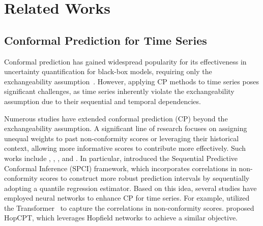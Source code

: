 \section{Related Works}
\label{sec:related_works}

\subsection{Conformal Prediction for Time Series}

Conformal prediction has gained widespread popularity for its effectiveness in uncertainty quantification for black-box models, requiring only the exchangeability assumption~\cite{vovk2005algorithmic}. However, applying CP methods to time series poses significant challenges, as time series inherently violate the exchangeability assumption due to their sequential and temporal dependencies. 

Numerous studies have extended conformal prediction (CP) beyond the exchangeability assumption. A significant line of research focuses on assigning unequal weights to past non-conformity scores or leveraging their historical context, allowing more informative scores to contribute more effectively. Such works include \citet{xu2023sequential}, \citet{xu2021conformal}, \citet{tibshirani2019conformal}, and \citet{lee2024kernel}. In particular, \citet{xu2023sequential} introduced the Sequential Predictive Conformal Inference (SPCI) framework, which incorporates correlations in non-conformity scores to construct more robust prediction intervals by sequentially adopting a quantile regression estimator. Based on this idea, several studies have employed neural networks to enhance CP for time series. For example, \citet{lee2024transformer} utilized the Transformer~\cite{vaswani2017attention} to capture the correlations in non-conformity scores. \citet{auer2024conformal} proposed HopCPT, which leverages Hopfield networks to achieve a similar objective.


